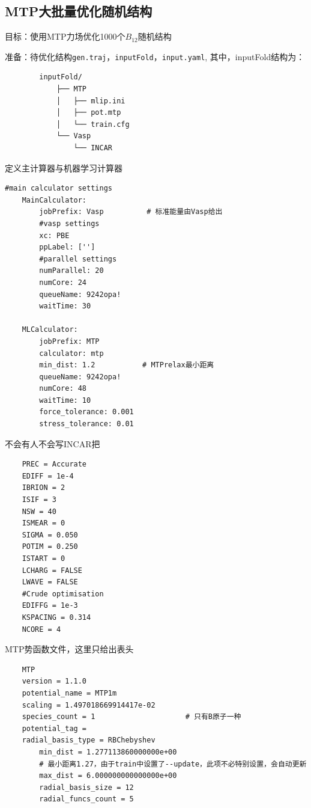 \documentclass[12pt]{article}
\newcommand{\file}[1]{\texttt{#1}}
\begin{document}
\subsection{MTP大批量优化随机结构} \label{mtpB}
目标：使用MTP力场优化1000个$B_{12}$随机结构\par
准备：待优化结构\file{gen.traj}，\file{inputFold}，\file{input.yaml},
其中，inputFold结构为：
\begin{verbatim}
        inputFold/
            ├── MTP
            │   ├── mlip.ini
            │   ├── pot.mtp
            │   └── train.cfg
            └── Vasp
                └── INCAR
\end{verbatim}

\begin{tcolorbox}[enhanced, breakable, title = {\file{input.yaml}}]
定义主计算器与机器学习计算器
\tcblower
\begin{verbatim}
#main calculator settings
    MainCalculator:
        jobPrefix: Vasp          # 标准能量由Vasp给出
        #vasp settings
        xc: PBE 
        ppLabel: ['']
        #parallel settings
        numParallel: 20
        numCore: 24
        queueName: 9242opa!
        waitTime: 30

    MLCalculator:
        jobPrefix: MTP
        calculator: mtp
        min_dist: 1.2           # MTPrelax最小距离
        queueName: 9242opa!
        numCore: 48
        waitTime: 10
        force_tolerance: 0.001 
        stress_tolerance: 0.01
\end{verbatim}
\end{tcolorbox}
\begin{tcolorbox}[enhanced, breakable, title = {\file{INCAR}}]
    不会有人不会写INCAR把
    \tcblower
    \begin{verbatim}                                                     
    PREC = Accurate
    EDIFF = 1e-4
    IBRION = 2 
    ISIF = 3 
    NSW = 40
    ISMEAR = 0 
    SIGMA = 0.050
    POTIM = 0.250
    ISTART = 0 
    LCHARG = FALSE
    LWAVE = FALSE
    #Crude optimisation
    EDIFFG = 1e-3
    KSPACING = 0.314
    NCORE = 4
    \end{verbatim}
\end{tcolorbox}
\begin{tcolorbox}[enhanced, breakable, title = {\file{pot.mtp}}]
    MTP势函数文件，这里只给出表头
    \tcblower
    \begin{verbatim}
    MTP                                                                                   
    version = 1.1.0
    potential_name = MTP1m
    scaling = 1.497018669914417e-02
    species_count = 1                     # 只有B原子一种
    potential_tag = 
    radial_basis_type = RBChebyshev
        min_dist = 1.277113860000000e+00  
        # 最小距离1.27，由于train中设置了--update，此项不必特别设置，会自动更新
        max_dist = 6.000000000000000e+00
        radial_basis_size = 12
        radial_funcs_count = 5
    \end{verbatim}
\end{tcolorbox}
\end{document}
